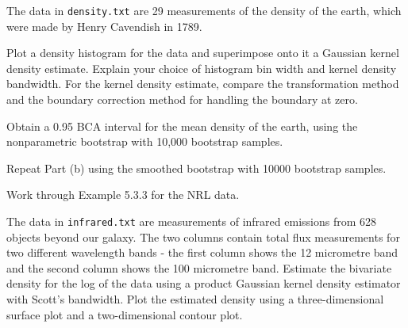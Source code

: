 \begin{exercise}
The data in {\tt density.txt} are 29 measurements of the density of the earth, which were made by Henry Cavendish in 1789.
\begin{asparaenum}[(a)]
\item Plot a density histogram for the data and superimpose onto it a Gaussian kernel density estimate. Explain your choice of histogram bin width and kernel density bandwidth. For the kernel density estimate, compare the transformation method and the boundary correction method for handling the boundary at zero.
\item Obtain a 0.95 BCA interval for the mean density of the earth, using the nonparametric bootstrap with 10,000 bootstrap samples.
\item Repeat Part (b) using the smoothed bootstrap with 10000 bootstrap samples.
\end{asparaenum}

\end{exercise}

\begin{exercise}
Work through Example 5.3.3 for the NRL data.
\end{exercise}

\begin{exercise}
The data in {\tt infrared.txt} are measurements of infrared emissions from 628 objects beyond our galaxy. The two columns contain total flux measurements for two different wavelength bands - the first column shows the 12 micrometre band and the second column shows the 100 micrometre band. Estimate the bivariate density for the log of the data using a product Gaussian kernel density estimator with Scott's bandwidth. Plot the estimated density using a three-dimensional surface plot and a two-dimensional contour plot.
\end{exercise} 
